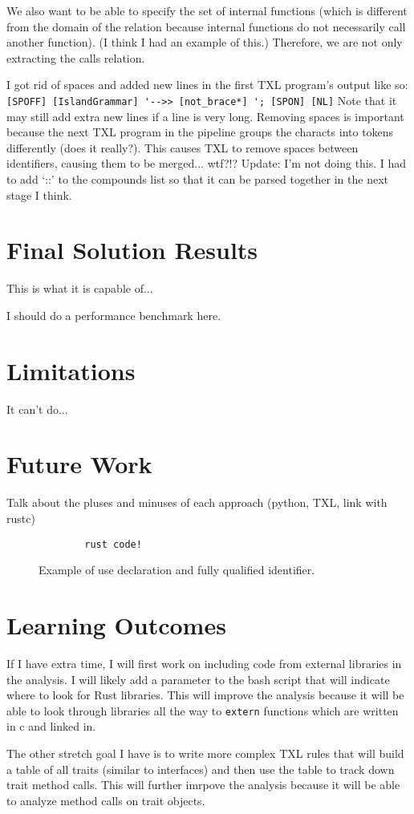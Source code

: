 \documentclass[11pt]{article}
\begin{document}
We also want to be able to specify the set of internal functions (which is different from the domain of the relation because internal functions do not necessarily call another function).
(I think I had an example of this.)
Therefore, we are not only extracting the calls relation.

I got rid of spaces and added new lines in the first TXL program's output like so:
\lstinline{[SPOFF] [IslandGrammar] '-->> [not_brace*] '; [SPON] [NL]}
Note that it may still add extra new lines if a line is very long.
Removing spaces is important because the next TXL program in the pipeline groups the characts into tokens differently (does it really?).
This causes TXL to remove spaces between identifiers, causing them to be merged... wtf?!?
Update:
I'm not doing this.
I had to add `::' to the compounds list so that it can be parsed together in the next stage I think.

\section{Final Solution Results}
This is what it is capable of...

I should do a performance benchmark here.

\section{Limitations}
It can't do...

\section{Future Work}

Talk about the pluses and minuses of each approach (python, TXL, link with rustc)


\begin{figure}
    \caption{Example of use declaration and fully qualified identifier.}
    \label{fig:qualifiers}
    \begin{lstlisting}
        rust code!
    \end{lstlisting}
\end{figure}

\section{Learning Outcomes}
If I have extra time, I will first work on including code from external libraries in the analysis.
I will likely add a parameter to the bash script that will indicate where to look for Rust libraries.
This will improve the analysis because it will be able to look through libraries all the way to \lstinline{extern} functions which are written in c and linked in.

The other stretch goal I have is to write more complex TXL rules that will build a table of all traits (similar to interfaces) and then use the table to track down trait method calls.
This will further imrpove the analysis because it will be able to analyze method calls on trait objects.
\end{document}
